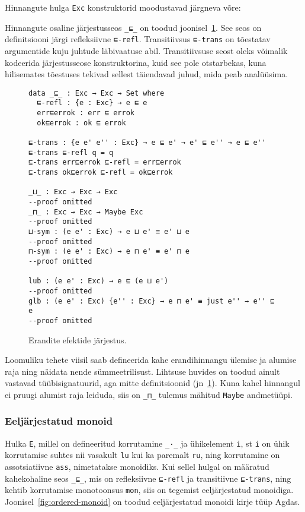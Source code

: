 \documentclass[a4paper,12pt]{article}
\begin{document}
Hinnangute hulga {\tt Exc} konstruktorid moodustavad järgneva võre:
\begin{center}
\end{center}
Hinnangute osaline järjestusseos {\tt _⊑_} on toodud joonisel~\ref{fig:exc.ord}.
See seos on definitsiooni järgi refleksiivne {\tt ⊑-refl}.
Transitiivsus {\tt ⊑-trans} on tõestatav argumentide kuju juhtude läbivaatuse abil.
Transitiivsuse seost oleks võimalik kodeerida järjestusseose konstruktorina, kuid see pole otstarbekas,
kuna hilisemates tõestuses tekivad sellest täiendavad juhud, mida peab analüüsima.

\begin{figure}
  \begin{BVerbatim}
data _⊑_ : Exc → Exc → Set where
  ⊑-refl : {e : Exc} → e ⊑ e
  err⊑errok : err ⊑ errok
  ok⊑errok : ok ⊑ errok
  
⊑-trans : {e e' e'' : Exc} → e ⊑ e' → e' ⊑ e'' → e ⊑ e''
⊑-trans ⊑-refl q = q
⊑-trans err⊑errok ⊑-refl = err⊑errok
⊑-trans ok⊑errok ⊑-refl = ok⊑errok

_⊔_ : Exc → Exc → Exc
--proof omitted
_⊓_ : Exc → Exc → Maybe Exc
--proof omitted
⊔-sym : (e e' : Exc) → e ⊔ e' ≡ e' ⊔ e
--proof omitted
⊓-sym : (e e' : Exc) → e ⊓ e' ≡ e' ⊓ e
--proof omitted
  
lub : (e e' : Exc) → e ⊑ (e ⊔ e')
--proof omitted
glb : (e e' : Exc) {e'' : Exc} → e ⊓ e' ≡ just e'' → e'' ⊑ e
--proof omitted
  \end{BVerbatim}
  \caption{Erandite efektide järjestus.}
  \label{fig:exc.ord}
\end{figure}
Loomuliku tehete viisil saab defineerida kahe erandihinnangu ülemise ja alumise raja ning näidata nende sümmeetrilisust.
Lihtsuse huvides on toodud ainult vastavad tüübisignatuurid, aga mitte definitsioonid (jn~\ref{fig:exc.ord}).
Kuna kahel hinnangul ei pruugi alumist raja leiduda, siis on {\tt _⊓_} tulemus mähitud {\tt Maybe} andmetüüpi.

\subsubsection{Eeljärjestatud monoid}\label{sssec:ordered-monoid}
Hulka {\tt E}, millel on defineeritud korrutamine {\tt _·_} ja ühikelement {\tt i},
st {\tt i} on ühik korrutamise suhtes nii vasakult {\tt lu} kui ka paremalt {\tt ru},
ning korrutamine on assotsiatiivne {\tt ass}, nimetatakse monoidiks.
Kui sellel hulgal on määratud kahekohaline seos {\tt _⊑_},
mis on refleksiivne {\tt ⊑-refl} ja transitiivne {\tt ⊑-trans},
ning kehtib korrutamise monotoonsus {\tt mon},
siis on tegemist eeljärjestatud monoidiga.
Joonisel~\ref{fig:ordered-monoid} on toodud eeljärjestatud monoidi kirje tüüp Agdas.
\end{document}
